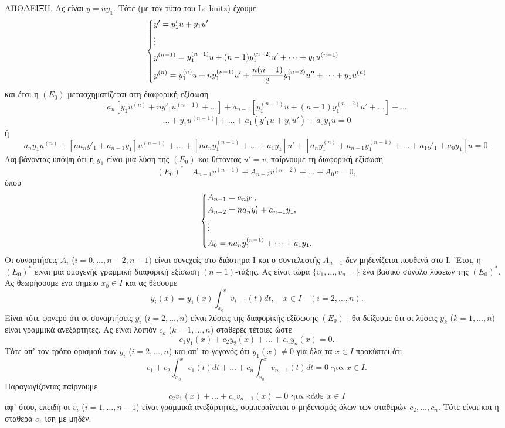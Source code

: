 \documentclass[11pt,a4paper,twoside]{book}
\newcommand{\eng}[1]{\selectlanguage{english}#1\selectlanguage{greek}}
\begin{document}
\textsc{ΑΠΟΔΕΙΞΗ.} Ας είναι $y=uy_1$. Τότε (με τον τύπο του \eng{Leibnitz}) έχουμε
\[
    \begin{dcases}
        y' = y'_1 u + y_1 u' \\
        \vdots \\
        y^{(n-1)} = y_1^{(n-1)}u + (n-1)y_1^{(n-2)}u' + \dots + y_1 u^{(n-1)} \\
        y^{(n)} = y_1^{(n)}u + n y_1^{(n-1)}u' + \frac{n(n-1)}{2} y_1^{(n-2)}u'' + \dots + y_1 u^{(n)}
    \end{dcases}
\]
και έτσι η $(E_0)$ μετασχηματίζεται στη διαφορική εξίσωση
\[
    a_n [y_1 u^{(n)} + n y'_1 u^{(n-1)} + \dots] + a_{n-1} [y_1^{(n-1)}u + (n-1)y_1^{(n-2)}u' + \dots] + \dots
\]
\[
\dots + y_1 u^{(n-1)}] + \dots + a_1(y'_1 u + y_1 u') + a_0 y_1 u = 0
\]
ή
\[
a_n y_1 u^{(n)} + [na_n y'_1 + a_{n-1} y_1] u^{(n-1)} + \dots + [na_n y_1^{(n-1)} + \dots + a_1 y_1] u' + [a_n y_1^{(n)} + a_{n-1} y_1^{(n-1)} + \dots + a_1 y'_1 + a_0 y_1] u = 0.
\]
Λαμβάνοντας υπόψη ότι η $y_1$ είναι μια λύση της $(E_0)$ και θέτοντας $u'=v$, παίρνουμε τη διαφορική εξίσωση
\[
    (E_0)^* \quad A_{n-1} v^{(n-1)} + A_{n-2} v^{(n-2)} + \dots + A_0 v = 0,
\]
όπου
\[
    \begin{dcases}
        A_{n-1} = a_n y_1, \\
        A_{n-2} = na_n y'_1 + a_{n-1} y_1, \\
        \vdots \\
        A_0 = na_n y_1^{(n-1)} + \dots + a_1 y_1.
    \end{dcases}
\]
Οι συναρτήσεις $A_i$ ($i=0, \dots, n-2, n-1$) είναι συνεχείς στο διάστημα Ι και ο συντελεστής $A_{n-1}$ δεν μηδενίζεται πουθενά στο Ι. 'Ετσι, η $(E_0)^*$ είναι μια ομογενής γραμμική διαφορική εξίσωση $(n-1)$-τάξης. Ας είναι τώρα $\{v_1, \dots, v_{n-1}\}$ ένα βασικό σύνολο λύσεων της $(E_0)^*$. Ας θεωρήσουμε ένα σημείο $x_0 \in I$ και ας θέσουμε
\[
    y_i(x) = y_1(x) \int_{x_0}^x v_{i-1}(t) dt, \quad x \in I \quad (i=2, \dots, n).
\]
Είναι τότε φανερό ότι οι συναρτήσεις $y_i$ ($i=2, \dots, n$) είναι λύσεις της διαφορικής εξίσωσης $(E_0)$ $\cdot$ θα δείξουμε ότι οι λύσεις $y_k$ ($k=1, \dots, n$) είναι γραμμικά ανεξάρτητες. Ας είναι λοιπόν $c_k$ ($k=1, \dots, n$) σταθερές τέτοιες ώστε
\[
    c_1 y_1(x) + c_2 y_2(x) + \dots + c_n y_n(x) = 0.
\]
Τότε απ' τον τρόπο ορισμού των $y_i$ ($i=2, \dots, n$) και απ' το γεγονός ότι $y_1(x) \ne 0$ για όλα τα $x \in I$ προκύπτει ότι
\[
    c_1 + c_2 \int_{x_0}^x v_1(t) dt + \dots + c_n \int_{x_0}^x v_{n-1}(t) dt = 0 \text{ για } x \in I.
\]
Παραγωγίζοντας παίρνουμε
\[
    c_2 v_1(x) + \dots + c_n v_{n-1}(x) = 0 \text{ για κάθε } x \in I
\]
αφ' ότου, επειδή οι $v_i$ ($i=1, \dots, n-1$) είναι γραμμικά ανεξάρτητες, συμπεραίνεται ο μηδενισμός όλων των σταθερών $c_2, \dots, c_n$. Τότε είναι και η σταθερά $c_1$ ίση με μηδέν.
\end{document}
